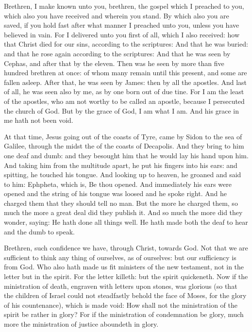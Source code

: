 


Brethren, I make known unto you, brethren, the gospel which I preached
to you, which also you have received and wherein you stand.
By which also you are saved, if you hold fast after what manner I
preached unto you, unless you have believed in vain.
For I delivered unto you first of all, which I also received: how
that Christ died for our sins, according to the scriptures:
And that he was buried: and that he rose again according to the
scriptures:
And that he was seen by Cephas, and after that by the eleven.
Then was he seen by more than five hundred brethren at once: of
whom many remain until this present, and some are fallen asleep.
After that, he was seen by James: then by all the apostles.
And last of all, he was seen also by me, as by one born out of due
tine.
For I am the least of the apostles, who am not worthy to be called
an apostle, because I persecuted the church of God.
But by the grace of God, I am what I am. And his grace in me hath
not been void.%



At that time, Jesus going out of the coasts of Tyre, came by Sidon to the
sea of Galilee, through the midst the of the coasts of Decapolis.
And they bring to him one deaf and dumb: and they besought him
that he would lay his hand upon him.
And taking him from the multitude apart, he put his fingers into
his ears: and spitting, he touched his tongue.
And looking up to heaven, he groaned and said to him: Ephpheta,
which is, Be thou opened.
And immediately his ears were opened and the string of his tongue
was loosed and he spoke right.
And he charged them that they should tell no man. But the more he
charged them, so much the more a great deal did they publish it.
And so much the more did they wonder, saying: He hath done all
things well. He hath made both the deaf to hear and the dumb to speak.





Brethren, such confidence we have, through Christ, towards God.
Not that we are sufficient to think any thing of ourselves, as of
ourselves: but our sufficiency is from God.
Who also hath made us fit ministers of the new testament, not in
the letter but in the spirit. For the letter killeth: but the spirit
quickeneth.
Now if the ministration of death, engraven with letters upon
stones, was glorious (so that the children of Israel could not
steadfastly behold the face of Moses, for the glory of his countenance),
which is made void:
How shall not the ministration of the spirit be rather in glory?
For if the ministration of condemnation be glory, much more the
ministration of justice aboundeth in glory.


